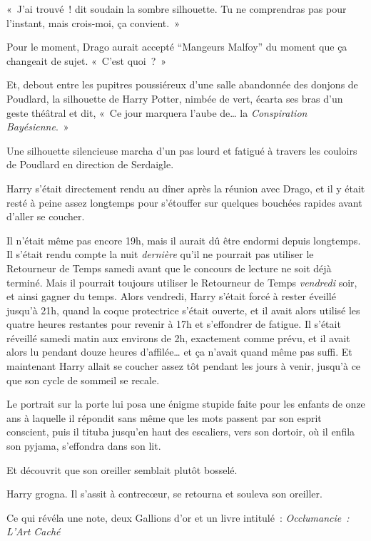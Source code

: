«~J'ai trouvé~! dit soudain la sombre silhouette. Tu ne comprendras pas pour l'instant, mais crois-moi, ça convient.~»

Pour le moment, Drago aurait accepté “Mangeurs Malfoy” du moment que ça changeait de sujet. «~C'est quoi~?~»

Et, debout entre les pupitres poussiéreux d'une salle abandonnée des donjons de Poudlard, la silhouette de Harry Potter, nimbée de vert, écarta ses bras d'un geste théâtral et dit, «~Ce jour marquera l'aube de… la \emph{Conspiration Bayésienne}.~»

\later

Une silhouette silencieuse marcha d'un pas lourd et fatigué à travers les couloirs de Poudlard en direction de Serdaigle.

Harry s'était directement rendu au dîner après la réunion avec Drago, et il y était resté à peine assez longtemps pour s'étouffer sur quelques bouchées rapides avant d'aller se coucher.

Il n'était même pas encore 19h, mais il aurait dû être endormi depuis longtemps. Il s'était rendu compte la nuit \emph{dernière} qu'il ne pourrait pas utiliser le Retourneur de Temps samedi avant que le concours de lecture ne soit déjà terminé. Mais il pourrait toujours utiliser le Retourneur de Temps \emph{vendredi} soir, et ainsi gagner du temps. Alors vendredi, Harry s'était forcé à rester éveillé jusqu'à 21h, quand la coque protectrice s'était ouverte, et il avait alors utilisé les quatre heures restantes pour revenir à 17h et s'effondrer de fatigue. Il s'était réveillé samedi matin aux environs de 2h, exactement comme prévu, et il avait alors lu pendant douze heures d'affilée… et ça n'avait quand même pas suffi. Et maintenant Harry allait se coucher assez tôt pendant les jours à venir, jusqu'à ce que son cycle de sommeil se recale.

Le portrait sur la porte lui posa une énigme stupide faite pour les enfants de onze ans à laquelle il répondit sans même que les mots passent par son esprit conscient, puis il tituba jusqu'en haut des escaliers, vers son dortoir, où il enfila son pyjama, s'effondra dans son lit.

Et découvrit que son oreiller semblait plutôt bosselé.

Harry grogna. Il s'assit à contrecœur, se retourna et souleva son oreiller.

Ce qui révéla une note, deux Gallions d'or et un livre intitulé~: \emph{Occlumancie~: L'Art Caché}


